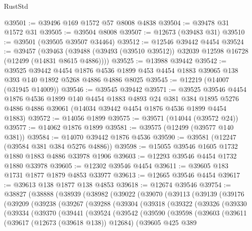\begin{lexlean}{RustStd}
\begin{coremodule}
@39501 := @39496 @169 @1572 @57 @8008 @4838
@39504 := @39478 @31 @1572 @31
@39505 := @39504 @8008
@39507 := @12673 (@39483 @31)
@39510 := @39501 (@39505 @39507 @34464)
@39512 := @12546 @39442 @4454
@39524 := @39457
    (@39463 (@39488 (@39493 (@39510 @39512)) @32039 @12598 @16728 (@12499 (@14831 @8615 @4886))))
@39525 := @13988 @39442
@39542 := @39525
    @39442
    @4454
    @1876
    @4536
    @1899
    @453
    @4454
    @1883
    @39065
    @138
    @393
    @140
    @1892
    @5268
    @4886
    @4886
    @8025
@39545 := @12219 (@14007 (@31945 @14009))
@39546 := @39545 @39442
@39571 := @39525
    @39546
    @4454
    @1876
    @4536
    @1899
    @140
    @4454
    @1883
    @4893
    @24
    @381
    @384
    @1895
    @5276
    @4886
    @4886
    @39061
    (@14034 @39442 @4454 @1876 @4536 @1899 @4454 @1883)
@39572 := @14056 @1899
@39575 := @39571 (@14044 (@39572 @24))
@39577 := @14062 @1876 @1899
@39581 := @39575 (@12499 (@39577 @140 @381))
@39584 := @14070 @39442 @1876 @4536
@39590 := @39581 (@12247 (@39584 @381 @384 @5276 @4886))
@39598 := @15055 @39546 @1605 @1732 @1880 @1883 @4886 @33978 @1906
@39603 := @12293 @39546 @4454 @1732 @1880 @33978
@39605 := @12302 @39546 @4454
@39611 := @39605 @183 @1731 @1877 @1879 @4853 @33977
@39613 := @12665 @39546 @4454
@39617 := @39613 @138 @1877 @138 @4853
@39618 := @12674 @39546
@39754 := @38827
    (@38888
      (@38939
        (@38982
          (@39022
            (@39070
              (@39113
                (@39139
                  (@39176
                    (@39209
                      (@39238
                        (@39267
                          (@39288
                            (@39304
                              (@39318
                                (@39322
                                  (@39326
                                    (@39330
                                      (@39334
                                        (@39370
                                          (@39441
                                            (@39524
                                              (@39542
                                                (@39590
                                                  (@39598
                                                    (@39603
                                                      (@39611
                                                        (@39617 (@12673 (@39618 @138)) @12684)
                                                        (@39605
                                                          @425
                                                          @389

\end{coremodule}
\end{lexlean}
